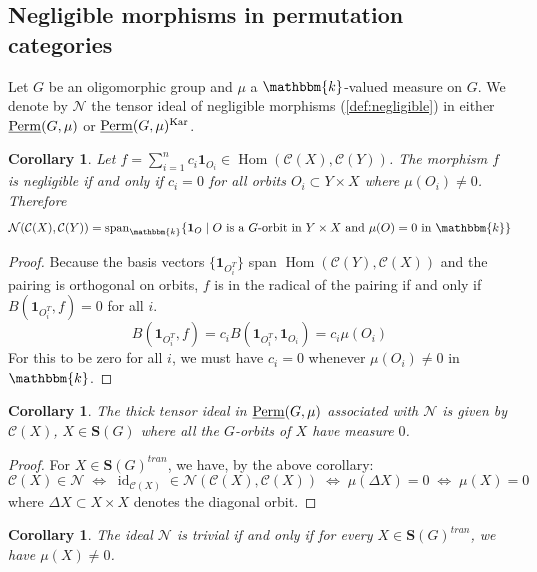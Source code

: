 \documentclass[11pt,a4paper]{amsart}
\theoremstyle{plain}%
\newtheorem{corollary}[lemma]{Corollary}
\theoremstyle{definition}
\theoremstyle{remark}
\newcommand{\Hom}{\operatorname{Hom}}
\newcommand{\id}{\operatorname{id}}
\newcommand{\Span}{\mathrm{span}}
\newcommand{\Perm}{\underline{{\rm Perm}}}
\newcommand{\kk}{\mathbbm{k}}
\newcommand{\one}{{\mathbf{1}}}
\newcommand{\Kar}{\mathrm{Kar}}
\newcommand{\cC}{\mathcal{C}}
\newcommand{\Set}[1]{\mathbf{S}(#1)}
\begin{document}

\subsection{Negligible morphisms in permutation categories}

Let $G$ be an oligomorphic group and $\mu$ a $\kk$-valued measure on $G$. We denote by $\mathcal{N}$ the tensor ideal of negligible morphisms (\cref{def:negligible}) in either $\Perm(G, \mu)$ or $\Perm(G, \mu)^{\Kar}$.

\begin{corollary}
Let $f = \sum_{i=1}^n c_i \one_{O_i} \in \Hom(\mathcal{C}(X), \mathcal{C}(Y))$. The morphism $f$ is negligible if and only if $c_i = 0$ for all orbits $O_i\subset Y\times X$ where $\mu(O_i) \neq 0$. Therefore \[ \mathcal{N}(\mathcal{C}(X), \mathcal{C}(Y)) = \Span_\kk \{ \one_O \mid O \text{ is a } G\text{-orbit in } Y \times X \text{ and } \mu(O) = 0 \text{ in } \kk \} \]
\end{corollary}

\begin{proof}
Because the basis vectors $\{\one_{O_i^T}\}$ span $\Hom(\mathcal{C}(Y), \mathcal{C}(X))$ and the pairing is orthogonal on orbits, $f$ is in the radical of the pairing if and only if $B(\one_{O_i^T}, f) = 0$ for all $i$. 
$$ B(\one_{O_i^T}, f) = c_i B(\one_{O_i^T}, \one_{O_i}) = c_i \mu(O_i) $$
For this to be zero for all $i$, we must have $c_i = 0$ whenever $\mu(O_i) \neq 0$ in $\kk$.
\end{proof}
\begin{corollary}
  The thick tensor ideal in $\Perm(G, \mu)$ associated with $\mathcal{N}$ is given by $\cC(X)$, $X\in \Set{G}$ where all the $G$-orbits of $X$ have measure $0$.  
\end{corollary}

\begin{proof}
   For $X\in \Set{G}^{tran}$, we have, by the above corollary: $$\cC(X) \in \mathcal{N}\; \Longleftrightarrow \; \id_{\cC{(X)}}\in \mathcal{N}(\mathcal{C}(X), \mathcal{C}(X)) \; \Longleftrightarrow \;\mu(\Delta X)=0 \; \Longleftrightarrow \; \mu(X)=0$$ where $\Delta X\subset X\times X$ denotes the diagonal orbit.
\end{proof}
\begin{corollary}

The ideal $\mathcal{N}$ is trivial if and only if for every $X\in \Set{G}^{tran}$, we have $\mu(X) \neq 0$.

\end{corollary}
\end{document}
